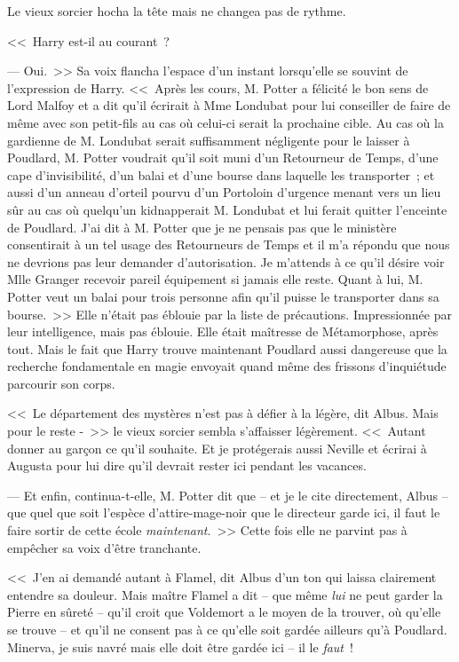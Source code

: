 Le vieux sorcier hocha la tête mais ne changea pas de rythme.

<<~Harry est-il au courant~?

--- Oui.~>> Sa voix flancha l'espace d'un instant lorsqu'elle se souvint de l'expression de Harry. <<~Après les cours, M. Potter a félicité le bon sens de Lord Malfoy et a dit qu'il écrirait à Mme Londubat pour lui conseiller de faire de même avec son petit-fils au cas où celui-ci serait la prochaine cible. Au cas où la gardienne de M. Londubat serait suffisamment négligente pour le laisser à Poudlard, M. Potter voudrait qu'il soit muni d'un Retourneur de Temps, d'une cape d'invisibilité, d'un balai et d'une bourse dans laquelle les transporter~; et aussi d'un anneau d'orteil pourvu d'un Portoloin d'urgence menant vers un lieu sûr au cas où quelqu'un kidnapperait M. Londubat et lui ferait quitter l'enceinte de Poudlard. J'ai dit à M. Potter que je ne pensais pas que le ministère consentirait à un tel usage des Retourneurs de Temps et il m'a répondu que nous ne devrions pas leur demander d'autorisation. Je m'attends à ce qu'il désire voir Mlle Granger recevoir pareil équipement si jamais elle reste. Quant à lui, M. Potter veut un balai pour trois personne afin qu'il puisse le transporter dans sa bourse.~>> Elle n'était pas éblouie par la liste de précautions. Impressionnée par leur intelligence, mais pas éblouie. Elle était maîtresse de Métamorphose, après tout. Mais le fait que Harry trouve maintenant Poudlard aussi dangereuse que la recherche fondamentale en magie envoyait quand même des frissons d'inquiétude parcourir son corps.

<<~Le département des mystères n'est pas à défier à la légère, dit Albus. Mais pour le reste -~>> le vieux sorcier sembla s'affaisser légèrement. <<~Autant donner au garçon ce qu'il souhaite. Et je protégerais aussi Neville et écrirai à Augusta pour lui dire qu'il devrait rester ici pendant les vacances.

--- Et enfin, continua-t-elle, M. Potter dit que -- et je le cite directement, Albus -- que quel que soit l'espèce d'attire-mage-noir que le directeur garde ici, il faut le faire sortir de cette école \emph{maintenant}.~>> Cette fois elle ne parvint pas à empêcher sa voix d'être tranchante.

<<~J'en ai demandé autant à Flamel, dit Albus d'un ton qui laissa clairement entendre sa douleur. Mais maître Flamel a dit -- que même \emph{lui} ne peut garder la Pierre en sûreté -- qu'il croit que Voldemort a le moyen de la trouver, où qu'elle se trouve -- et qu'il ne consent pas à ce qu'elle soit gardée ailleurs qu'à Poudlard. Minerva, je suis navré mais elle doit être gardée ici -- il le \emph{faut}~!

